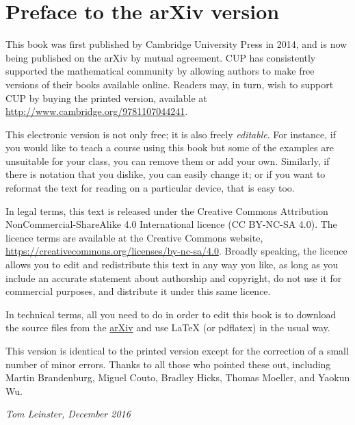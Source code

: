 % 
% 
% 

\frontmatter

\setcounter{page}{3}

\chapter*{Preface to the arXiv version}


This book was first published by Cambridge University Press in 2014, and is
now being published on the arXiv by mutual agreement.  CUP has consistently
supported the mathematical community by allowing authors to make free
versions of their books available online.  Readers may, in turn, wish to
support CUP by buying the printed version, available at
\href{http://www.cambridge.org/9781107044241}{\url{http://www.cambridge.org/9781107044241}}.

This electronic version is not only free; it is also freely
\emph{editable}.  For instance, if you would like to teach a course using
this book but some of the examples are unsuitable for your class, you can
remove them or add your own.  Similarly, if there is notation that you
dislike, you can easily change it; or if you want to reformat the text for
reading on a particular device, that is easy too.

In legal terms, this text is released under the Creative Commons
Attribution NonCommercial-ShareAlike 4.0 International licence (CC BY-NC-SA
4.0).  The licence terms are available at the Creative Commons website,
\href{https://creativecommons.org/licenses/by-nc-sa/4.0/}{\url{https://creativecommons.org/licenses/by-nc-sa/4.0}}.
Broadly speaking, the licence allows you to edit and redistribute this text
in any way you like, as long as you include an accurate statement about
authorship and copyright, do not use it for commercial purposes, and
distribute it under this same licence.

In technical terms, all you need to do in order to edit this book is to
download the source files from the \href{https://arxiv.org/pdf/1612.09375}{arXiv} and use
\LaTeX{} (or pdflatex) in the usual way.  

This version is identical to the printed version except for the correction
of a small number of minor errors.  Thanks to all those who pointed these
out, including Martin Brandenburg, Miguel Couto, Bradley Hicks, Thomas
Moeller, and Yaokun Wu.

\hfill\textit{Tom Leinster, December 2016}



\thispagestyle{empty}
 
